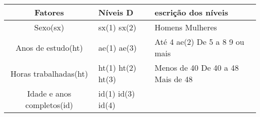 \documentclass[]{book}
\begin{document}
\begin{longtable}[]{@{}cll@{}}
\toprule
\begin{minipage}[b]{0.48\columnwidth}\centering\strut
Fatores\strut
\end{minipage} & \begin{minipage}[b]{0.20\columnwidth}\raggedright\strut
Níveis D\strut
\end{minipage} & \begin{minipage}[b]{0.21\columnwidth}\raggedright\strut
escrição dos níveis\strut
\end{minipage}\tabularnewline
\midrule
\endhead
\begin{minipage}[t]{0.48\columnwidth}\centering\strut
Sexo(sx)\strut
\end{minipage} & \begin{minipage}[t]{0.20\columnwidth}\raggedright\strut
sx(1) sx(2)\strut
\end{minipage} & \begin{minipage}[t]{0.21\columnwidth}\raggedright\strut
Homens Mulheres\strut
\end{minipage}\tabularnewline
\begin{minipage}[t]{0.48\columnwidth}\centering\strut
Anos de estudo(ht)\strut
\end{minipage} & \begin{minipage}[t]{0.20\columnwidth}\raggedright\strut
ae(1) ae(3)\strut
\end{minipage} & \begin{minipage}[t]{0.21\columnwidth}\raggedright\strut
Até 4 ae(2) De 5 a 8 9 ou mais\strut
\end{minipage}\tabularnewline
\begin{minipage}[t]{0.48\columnwidth}\centering\strut
Horas trabalhadas(ht)\strut
\end{minipage} & \begin{minipage}[t]{0.20\columnwidth}\raggedright\strut
ht(1) ht(2) ht(3)\strut
\end{minipage} & \begin{minipage}[t]{0.21\columnwidth}\raggedright\strut
Menos de 40 De 40 a 48 Mais de 48\strut
\end{minipage}\tabularnewline
\begin{minipage}[t]{0.48\columnwidth}\centering\strut
Idade e anos completos(id)\strut
\end{minipage} & \begin{minipage}[t]{0.20\columnwidth}\raggedright\strut
id(1) id(3) id(4)\strut
\end{minipage} & \begin{minipage}[t]{0.21\columnwidth}\raggedright\strut

\end{minipage}
\end{longtable}
\end{document}
